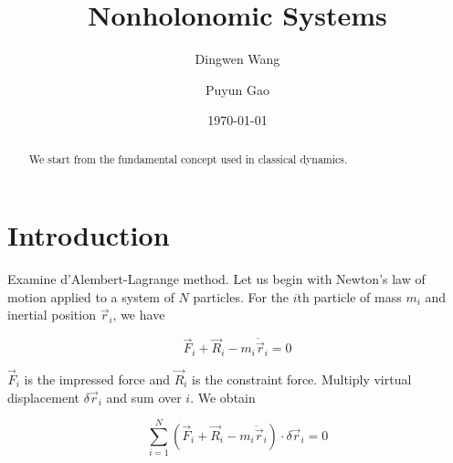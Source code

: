 \documentclass[prb,preprint]{revtex4-1}
\begin{document}

\title{Nonholonomic Systems}

\author{Dingwen Wang}
\author{Puyun Gao}

\date{\today}
\begin{abstract}
  We start from the fundamental concept used in classical dynamics.
\end{abstract}

\maketitle


\section{Introduction} %

Examine d'Alembert-Lagrange method.  Let us begin with Newton's law of
motion applied to a system of $N$ particles. For the $i$th particle of
mass $m_i$ and inertial position $\vec{r}_i$, we have

\begin{equation}
  \vec{F}_i + \vec{R}_i - m_i \ddot{\vec{r}}_i = 0
\end{equation}

$\vec{F}_i$ is the impressed force and $\vec{R}_i$ is the constraint
force. Multiply virtual displacement $\delta \vec{r}_i$ and sum over
$i$. We obtain

 \begin{equation}
   \label{eq:dalembert-principle}
   \sum_{i=1}^{N}( \vec{F}_i + \vec{R}_i - m_i \ddot{\vec{r}}_i) \cdot \delta \vec{r}_i = 0
 \end{equation}
\end{document}
